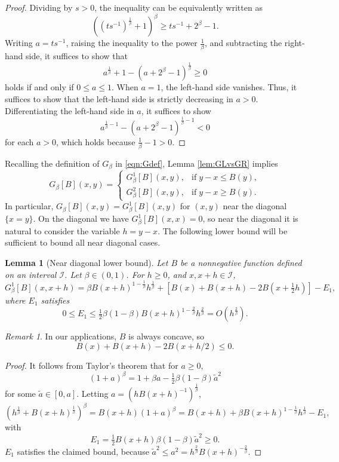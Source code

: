 \documentclass[12pt]{amsart}
\theoremstyle{plain}
\newtheorem{lem}[thm]{Lemma}
\theoremstyle{definition}
\theoremstyle{remark}
\newtheorem{rem}[thm]{Remark}
\numberwithin{equation}{section}
\begin{document}
\begin{proof}
Dividing by $s>0$, the inequality can be equivalently written as 
\[ ( ( ts^{-1})^{\tfrac{1}{\beta}}+1 )^\beta  \ge ts^{-1} + 2^\beta-1. \] 
Writing $a=ts^{-1}$, raising the inequality to the power $\frac{1}{\beta}$, and subtracting the right-hand side, it suffices to show that
\[  a^{\frac{1}{\beta}}+1  - (a + 2^\beta-1)^{\frac{1}{\beta}}  \ge 0 \] 
holds 
if and only if $0\leq a\leq 1$. 
When $a=1$, the left-hand side vanishes. Thus, it suffices to show that the left-hand side is strictly decreasing in $a>0$. 
Differentiating the left-hand side in $a$, it suffices to show    
\[a^{\frac{1}{\beta}-1}  - (a + 2^\beta-1)^{\frac{1}{\beta}-1} < 0\]
for each  $a>0$, which  holds because $\tfrac{1}{\beta}-1> 0$. 
\end{proof}
Recalling the definition of $G_\beta$ in \eqref{eqn:Gdef}, Lemma \ref{lem:GLvsGR} implies
\[ G_\beta[B](x,y) = \left\{\begin{array}{ll}
G^1_\beta[B](x,y), & \text{if}\;y-x\le B(y),\\
G^2_\beta[B](x,y), & \text{if}\;y-x\ge B(y).
\end{array}\right. \]
In particular, $G_\beta[B](x,y)=G^1_\beta[B](x,y)$ for $(x,y)$ near the diagonal $\{x=y\}$.
On the diagonal we have $G^1_\beta[B](x,x)=0$, so near the diagonal it is natural to consider the variable $h=y-x$.
The following lower bound will be 
sufficient to bound all near diagonal cases.
\begin{lem}[Near diagonal lower bound]\label{lem:neardiaglowerbd}
Let $B$ be a nonnegative function defined on an interval $\mathcal{I}$.
Let $\beta\in (0,1)$. For $h\ge 0$, and $x,x+h\in\mathcal{I}$,
\[ G^1_\beta[B](x,x+h) = \beta B(x+h)^{1-\frac1\beta} h^{\frac1\beta} + [B(x)+B(x+h)-2B(x+\tfrac12h)] - E_1, \]
where $E_1$ satisfies
\[ 0\le E_1 \le \tfrac12 \beta (1-\beta) B(x+h)^{1-\frac2\beta} h^{\frac2\beta} = O(h^{\frac2\beta}). \]
\end{lem}

\begin{rem}
In our applications, $B$ is always concave, so 
\[B(x)+B(x+h)-2B(x+h/2)\le 0.\]
\end{rem}


\begin{proof}
It follows from Taylor's theorem that for $a\ge 0$,
\[ (1+a)^\beta = 1 + \beta a - \tfrac12 \beta(1-\beta) \widetilde{a}^2 \]
for some $\widetilde{a}\in [0,a]$.
Letting $a=(h B(x+h)^{-1})^{\frac1\beta}$,
\[ (h^{\frac1\beta} + B(x+h)^{\frac1\beta})^\beta = B(x+h) (1+a)^\beta = B(x+h) + \beta B(x+h)^{1-\frac1\beta} h^{\frac1\beta} - E_1, \]
with
\[ E_1 = \tfrac12 B(x+h) \beta(1-\beta) \widetilde{a}^2\ge 0. \]
$E_1$ satisfies the claimed bound, because
$\widetilde{a}^2 \le a^2=h^{\frac2\beta} B(x+h)^{-\frac2\beta}$.
\end{proof}
\end{document}
